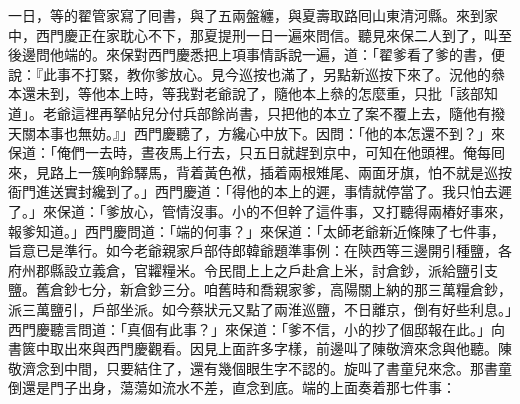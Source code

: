 一日，等的翟管家寫了囘書，與了五兩盤纏，與夏壽取路囘山東清河縣。來到家中，西門慶正在家耽心不下，那夏提刑一日一遍來問信。聽見來保二人到了，叫至後邊問他端的。來保對西門慶悉把上項事情訴說一遍，道：「翟爹看了爹的書，便說：『此事不打緊，教你爹放心。見今巡按也滿了，另點新巡按下來了。況他的叅本還未到，等他本上時，等我對老爺說了，隨他本上叅的怎麼重，只批「該部知道」。老爺這裡再拏帖兒分付兵部餘尚書，只把他的本立了案不覆上去，隨他有撥天關本事也無妨。』」西門慶聽了，方纔心中放下。因問：「他的本怎還不到？」來保道：「俺們一去時，晝夜馬上行去，只五日就趕到京中，可知在他頭裡。俺每囘來，見路上一簇响鈴驛馬，背着黃色袱，插着兩根雉尾、兩面牙旗，怕不就是巡按衙門進送實封纔到了。」西門慶道：「得他的本上的遲，事情就停當了。我只怕去遲了。」來保道：「爹放心，管情沒事。小的不但幹了這件事，又打聽得兩樁好事來，報爹知道。」西門慶問道：「端的何事？」來保道：「太師老爺新近條陳了七件事，旨意已是準行。如今老爺親家戶部侍郎韓爺題準事例：在陝西等三邊開引種鹽，各府州郡縣設立義倉，官糶糧米。令民間上上之戶赴倉上米，討倉鈔，派給鹽引支鹽。舊倉鈔七分，新倉鈔三分。咱舊時和喬親家爹，高陽關上納的那三萬糧倉鈔，派三萬鹽引，戶部坐派。如今蔡狀元又點了兩淮巡鹽，不日離京，倒有好些利息。」{}西門慶聽言問道：「真個有此事？」來保道：「爹不信，小的抄了個邸報在此。」向書篋中取出來與西門慶觀看。因見上面許多字樣，前邊叫了陳敬濟來念與他聽。陳敬濟念到中間，只要結住了，還有幾個眼生字不認的。旋叫了書童兒來念。那書童倒還是門子出身，蕩蕩如流水不差，直念到底。端的上面奏着那七件事：

